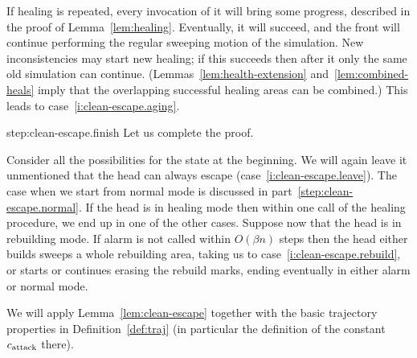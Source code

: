 \documentclass[12pt]{memoir}
\newcommand{\cns}[1]{c_{\textrm{\upshape #1}}}
\newcommand{\CAtt}{\cns{attack}}
\begin{document}
\begin{Proof}
\begin{pproof}
If healing is repeated, every invocation of it will bring some progress, described in the proof of 
Lemma~\ref{lem:healing}.
Eventually, it will succeed, and the front will continue performing the regular sweeping motion of 
the simulation.
New inconsistencies may start new healing; if this succeeds then after it only the same old simulation
can continue.
(Lemmas~\ref{lem:health-extension} and~\ref{lem:combined-heals} imply that 
the overlapping successful healing areas can be combined.)
This leads to case~\eqref{i:clean-escape.aging}.
\end{pproof} %

\begin{step+}{step:clean-escape.finish}
Let us complete the proof.
\end{step+}
\begin{prooof}
Consider all the possibilities for the state at the beginning.
We will again leave it unmentioned that the head can always escape (case~\eqref{i:clean-escape.leave}).
The case when we start from normal mode is discussed in part~\ref{step:clean-escape.normal}.
If the head is in healing mode then within one call of the healing procedure, we end up in
one of the other cases.
Suppose now that the head is in rebuilding mode.
If alarm is not called within \( O(\beta n) \) steps then the head either builds sweeps
a whole rebuilding area, taking us to case~\eqref{i:clean-escape.rebuild},
or starts or continues erasing the rebuild marks, ending eventually in either
alarm or normal mode.
\end{prooof} %
\end{Proof}

We will apply Lemma~\ref{lem:clean-escape} together with
the basic trajectory properties in Definition~\ref{def:traj} (in particular 
the definition of the constant \( \CAtt  \) there).
\end{document}
